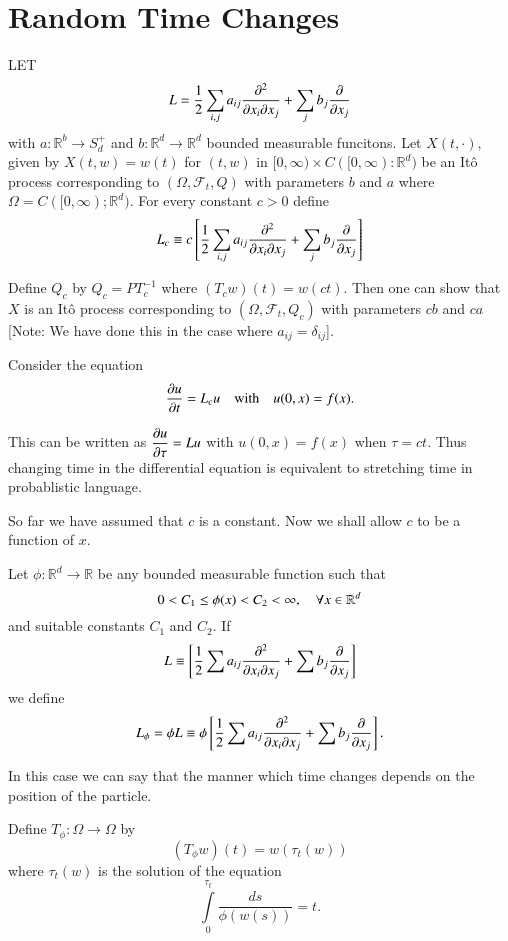 \chapter{Random Time Changes}\label{chap28}

LET\pageoriginale
$$
L=\frac{1}{2}\sum\limits_{i,j}a_{ij}\frac{\partial^{2}}{\partial x_{i}\partial
  x_{j}}+\sum_{j}b_{j}\frac{\partial}{\partial x_{j}}
$$
with $a:\mathbb{R}^{b}\to S^{+}_{d}$ and $b:\mathbb{R}^{d}\to
\mathbb{R}^{d}$ bounded measurable funcitons. Let $X(t,\cdot)$, given
by $X(t,w)=w(t)$ for $(t,w)$ in $[0,\infty)\times
  C([0,\infty):\mathbb{R}^{d})$ be an It\^o process corresponding to
    $(\Omega,\mathscr{F}_{t},Q)$ with parameters $b$ and $a$ where
    $\Omega=C([0,\infty);\mathbb{R}^{d})$. For every constant $c>0$
      define
$$
L_{c}\equiv c\left[\frac{1}{2}\sum_{i,j}a_{ij}\frac{\partial^{2}}{\partial x_{i}\partial
    x_{j}}+\sum_{j}b_{j}\frac{\partial}{\partial x_{j}}\right]
$$

Define $Q_{c}$ by $Q_{c}=PT^{-1}_{c}$ where $(T_{c}w)(t)=w(ct)$. Then
one can show that $X$ is an It\^o process corresponding to
$(\Omega,\mathscr{F}_{t},Q_{c})$ with parameters $cb$ and $ca$ [Note:
  We have done this in the case where $a_{ij}=\delta_{ij}$].

Consider the equation
$$
\frac{\partial u}{\partial t}=L_{c}u\quad\text{with}\quad u(0,x)=f(x).
$$

This can be written as $\dfrac{\partial u}{\partial \tau}=Lu$ with $u(0,x)=f(x)$
when $\tau=ct$. Thus changing time in the differential equation is
equivalent to stretching time in probablistic language.

So far we have assumed that $c$ is a constant. Now we shall allow $c$
to be a function of $x$.

Let $\phi:\mathbb{R}^{d}\to \mathbb{R}$ be any bounded measurable
function such that 
$$
0<C_{1}\leq \phi(x)<C_{2}<\infty,\quad \forall x\in \mathbb{R}^{d}
$$
and suitable constants $C_{1}$ and $C_{2}$. If
$$
L\equiv \left[\frac{1}{2}\sum a_{ij}\frac{\partial^{2}}{\partial x_{i}\partial
    x_{j}}+\sum b_{j}\frac{\partial}{\partial x_{j}}\right]
$$\pageoriginale
we define
$$
L_{\phi}=\phi L\equiv \phi\left[\frac{1}{2}\sum a_{ij}\frac{\partial^{2}}{\partial
    x_{i}\partial x_{j}}+\sum b_{j}\frac{\partial}{\partial x_{j}}\right].
$$

In this case we can say that the manner which time changes depends on
the position of the particle.

Define $T_{\phi}:\Omega\to \Omega$ by
$$
(T_{\phi}w)(t)=w(\tau_{t}(w))
$$
where $\tau_{t}(w)$ is the solution of the equation
$$
\int\limits^{\tau_{t}}_{0}\frac{ds}{\phi(w(s))}=t.
$$

